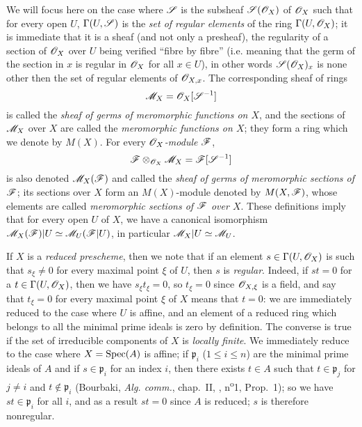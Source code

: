 \begin{env}[20.1.3]
\label{IV.20.1.3}
We will focus here on the case where $\mathscr{S}$ is the subsheaf $\mathscr{S}(\mathscr{O}_X)$ of $\mathscr{O}_X$ such that for every open $U$, $\Gamma(U,\mathscr{S})$ is the \emph{set of regular elements} of the ring $\Gamma(U,\mathscr{O}_X)$;
it is immediate that it is a sheaf (and not only a presheaf), the regularity of a section of $\mathscr{O}_X$ over $U$ being verified ``fibre by fibre'' (i.e. meaning that the germ of the section in $x$ is regular in $\mathscr{O}_X$ for all $x\in U$), in other words $\mathscr{S}(\mathscr{O}_X)_x$ is none other then the set of regular elements of $\mathscr{O}_{X,x}$.
The corresponding sheaf of rings
\[
  \mathscr{M}_X=\mathscr{O}_X[\mathscr{S}^{-1}]
\]
is called the \emph{sheaf of germs of meromorphic functions on $X$}, and the sections of $\mathscr{M}_X$ over $X$ are called the \emph{meromorphic functions on $X$};
they form a ring which we denote by $M(X)$.
For every \emph{$\mathscr{O}_X$-module $\mathscr{F}$},
\[
  \mathscr{F}\otimes_{\mathscr{O}_X}\mathscr{M}_X=\mathscr{F}[\mathscr{S}^{-1}]
\]
is also denoted $\mathscr{M}_X(\mathscr{F})$ and called the \emph{sheaf of germs of meromorphic sections of $\mathscr{F}$};
its sections over $X$ form an $M(X)$-module denoted by $M(X,\mathscr{F})$, whose elements are called \emph{meromorphic sections of $\mathscr{F}$ over $X$}.
These definitions imply that for every open $U$ of $X$, we have a canonical isomorphism $\mathscr{M}_X(\mathscr{F})|U\simeq\mathscr{M}_U(\mathscr{F}|U)$, in particular $\mathscr{M}_X|U\simeq\mathscr{M}_U$.
\end{env}

\begin{env}[20.1.3.1]
\label{IV.20.1.3.1}
If $X$ is a \emph{reduced prescheme}, then we note that if an element $s\in\Gamma(U,\mathscr{O}_X)$ is such that $s_\xi\neq 0$ for every maximal point $\xi$ of $U$, then $s$ is \emph{regular}.
Indeed, if $st=0$ for a $t\in\Gamma(U,\mathscr{O}_X)$, then we have $s_\xi t_\xi=0$, so $t_\xi=0$ since $\mathscr{O}_{X,\xi}$ is a field, and say that $t_\xi=0$ for every maximal point $\xi$ of $X$ means that $t=0$:
we are immediately reduced to the case where $U$ is affine, and an element of a reduced ring which belongs to all the minimal prime ideals is zero by definition.
The converse is true if the set of irreducible components of $X$ is \emph{locally finite}.
We immediately reduce to the case where $X=\operatorname{Spec}(A)$ is affine;
if $\mathfrak{p}_i$ ($1\leq i\leq n$) are the minimal prime ideals of $A$ and if $s\in\mathfrak{p}_i$ for an index $i$, then there exists $t\in A$ such that $t\in\mathfrak{p}_j$ for $j\neq i$ and $t\not\in\mathfrak{p}_i$ (Bourbaki, \emph{Alg. comm.}, chap.~II, , n\textsuperscript{o}1, Prop.~1);
so we have $st\in\mathfrak{p}_i$ for all $i$, and as a result $st=0$ since $A$ is reduced;
$s$ is therefore nonregular.
\end{env}

